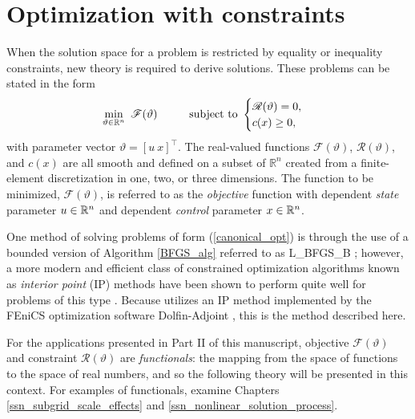 
\chapter{Optimization with constraints} \label{ssn_optimization_with_constraints}

When the solution space for a problem is restricted by equality or inequality constraints, new theory is required to derive solutions.  These problems can be stated in the form \citep{nocedal_2000}
\begin{align}
  \label{canonical_opt}
  \min_{\vartheta \in \R^n}\ \mathscr{F}(\vartheta) \hspace{10mm} \text{subject to  }
  \begin{cases}
    \mathscr{R}(\vartheta) = 0, \\
    c(x) \geq 0,
  \end{cases}
\end{align}
with parameter vector $\vartheta = [u\ x]^\intercal$.  The real-valued functions $\mathscr{F}(\vartheta)$, $\mathscr{R}(\vartheta)$, and $c(x)$ are all smooth and defined on a subset of $\mathbb{R}^n$ created from a finite-element discretization in one, two, or three dimensions.  The function to be minimized, $\mathscr{F}(\vartheta)$, is referred to as the  \emph{objective} function with dependent  \emph{state} parameter $u \in \mathbb{R}^n$ and dependent \emph{control} parameter $x \in \mathbb{R}^n$.

One method of solving problems of form (\ref{canonical_opt}) is through the use of a bounded version of Algorithm \ref{BFGS_alg} referred to as L\_BFGS\_B \citep{byrd_1995}; however, a more modern and efficient class of constrained optimization algorithms known as  \emph{interior point} (IP) methods have been shown to perform quite well for problems of this type \citep{nocedal_2000}.  Because \CSLVR utilizes an IP method implemented by the FEniCS optimization software Dolfin-Adjoint \citep{farrell_2013}, this is the method described here.

For the applications presented in Part II of this manuscript, objective $\mathscr{F}(\vartheta)$ and constraint $\mathscr{R}(\vartheta)$ are  \emph{functionals}: the mapping from the space of functions to the space of real numbers, and so the following theory will be presented in this context. For examples of functionals, examine Chapters \ref{ssn_subgrid_scale_effects} and \ref{ssn_nonlinear_solution_process}.

